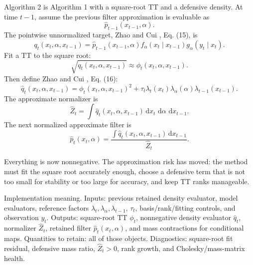 \documentclass[11pt]{article}
\numberwithin{equation}{section}
\newcommand{\dd}{\,\mathrm d}
\begin{document}
Algorithm 2 is Algorithm 1 with a square-root TT and a defensive density.
At time \(t-1\), assume the previous filter approximation is evaluable as
\[
    \widehat p_{t-1}(x_{t-1},\alpha).
\]
The pointwise unnormalized target, Zhao and Cui \cite{zhao2024ttsequential}, Eq. (15), is
\begin{equation}
    q_t(x_t,\alpha,x_{t-1})
    =
    \widehat p_{t-1}(x_{t-1},\alpha)
    f_\alpha(x_t\mid x_{t-1})
    g_\alpha(y_t\mid x_t).
    \label{eq:p24-a2-1}
\end{equation}
Fit a TT to the square root:
\begin{equation}
    \sqrt{q_t(x_t,\alpha,x_{t-1})}
    \approx
    \phi_t(x_t,\alpha,x_{t-1}).
    \label{eq:p24-a2-2}
\end{equation}
Then define Zhao and Cui \cite{zhao2024ttsequential}, Eq. (16):
\begin{equation}
    \widehat q_t(x_t,\alpha,x_{t-1})
    =
    \phi_t(x_t,\alpha,x_{t-1})^2
    +
    \tau_t\lambda_t(x_t)\lambda_\alpha(\alpha)\lambda_{t-1}(x_{t-1}).
    \label{eq:p24-a2-3}
\end{equation}
The approximate normalizer is
\begin{equation}
    \widehat Z_t
    =
    \int \widehat q_t(x_t,\alpha,x_{t-1})
    \dd x_t\,\dd\alpha\,\dd x_{t-1}.
    \label{eq:p24-a2-4}
\end{equation}
The next normalized approximate filter is
\begin{equation}
    \widehat p_t(x_t,\alpha)
    =
    \frac{\int \widehat q_t(x_t,\alpha,x_{t-1})\dd x_{t-1}}
    {\widehat Z_t}.
    \label{eq:p24-a2-5}
\end{equation}

Everything is now nonnegative.  The approximation risk has moved: the method
must fit the square root accurately enough, choose a defensive term that is not
too small for stability or too large for accuracy, and keep TT ranks manageable.

Implementation meaning. Inputs: previous retained density evaluator,
model evaluators, reference factors \(\lambda_t,\lambda_\alpha,\lambda_{t-1}\),
\(\tau_t\), basis/rank/fitting controls, and observation \(y_t\).  Outputs:
square-root TT \(\phi_t\), nonnegative density evaluator \(\widehat q_t\),
normalizer \(\widehat Z_t\), retained filter \(\widehat p_t(x_t,\alpha)\), and
mass contractions for conditional maps.  Quantities to retain: all of those objects.
Diagnostics: square-root fit residual, defensive mass ratio, \(\widehat Z_t>0\),
rank growth, and Cholesky/mass-matrix health.
\end{document}
